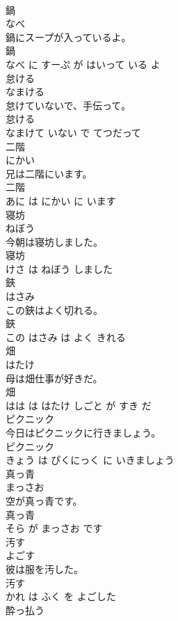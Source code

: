 \documentclass[8pt]{extreport}
\begin{document}
\begin{CJK}{UTF8}{min}
\\	鍋	
\\	なべ			
\\	鍋にスープが入っているよ。	
\\	鍋 
\\	なべ に すーぷ が はいって いる よ			
\\	怠ける	
\\	なまける			
\\	怠けていないで、手伝って。	
\\	怠ける 
\\	なまけて いない で てつだって			
\\	二階	
\\	にかい			
\\	兄は二階にいます。	
\\	二階 
\\	あに は にかい に います			
\\	寝坊	
\\	ねぼう			
\\	今朝は寝坊しました。	
\\	寝坊 
\\	けさ は ねぼう しました			
\\	鋏	
\\	はさみ			
\\	この鋏はよく切れる。	
\\	鋏 
\\	この はさみ は よく きれる			
\\	畑	
\\	はたけ			
\\	母は畑仕事が好きだ。	
\\	畑 
\\	はは は はたけ しごと が すき だ			
\\	ピクニック	
\\	今日はピクニックに行きましょう。	
\\	ピクニック 
\\	きょう は ぴくにっく に いきましょう			
\\	真っ青	
\\	まっさお			
\\	空が真っ青です。	
\\	真っ青 
\\	そら が まっさお です			
\\	汚す	
\\	よごす			
\\	彼は服を汚した。	
\\	汚す 
\\	かれ は ふく を よごした			
\\	酔っ払う	

\end{CJK}
\end{document}
